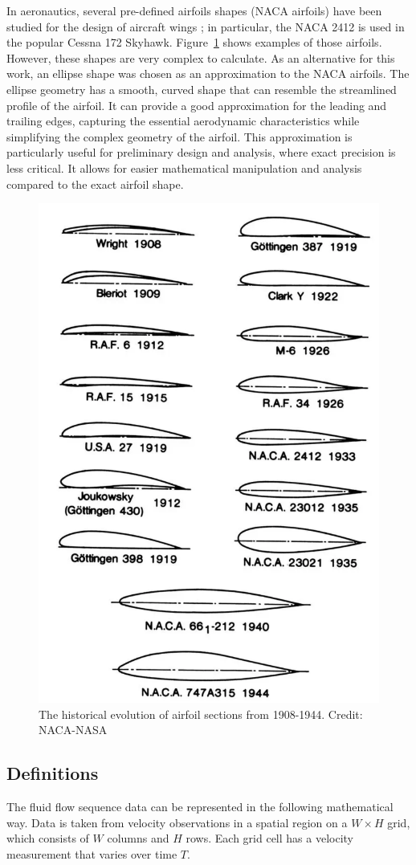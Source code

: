 In aeronautics, several pre-defined airfoils shapes (NACA airfoils) have been studied for the design of aircraft wings \cite{abbott_ira_h_summary_1945}; in particular, the NACA 2412 is used in the popular Cessna 172 Skyhawk. Figure~\ref{fig:naca_airfoils} shows examples of those airfoils. However, these shapes are very complex to calculate. As an alternative for this work, an ellipse shape was chosen as an approximation to the NACA airfoils. The ellipse geometry has a smooth, curved shape that can resemble the streamlined profile of the airfoil. It can provide a good approximation for the leading and trailing edges, capturing the essential aerodynamic characteristics while simplifying the complex geometry of the airfoil. This approximation is particularly useful for preliminary design and analysis, where exact precision is less critical. It allows for easier mathematical manipulation and analysis compared to the exact airfoil shape.

\begin{figure}[!ht]
    \centering
    \includegraphics[width=0.6\linewidth]{images/naca_airfoils.png}
    \caption{The historical evolution of airfoil sections from 1908-1944. Credit: NACA-NASA}
    \label{fig:naca_airfoils}
\end{figure}

\subsection{Definitions}
The fluid flow sequence data can be represented in the following mathematical way. Data is taken from velocity observations in a spatial region on a $W \times H$ grid, which consists of $W$ columns and $H$ rows. Each grid cell has a velocity measurement that varies over time $T$.

